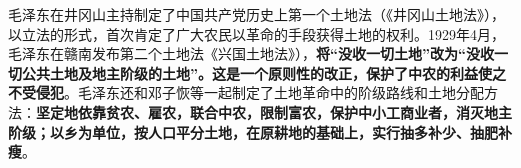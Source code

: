 {毛泽东在}井冈山主持制定了中国共产党历史上第一个土地法{（}《井冈山土地法》{），以立法的形式，首次肯定了广大农民以革命的手段获得土地的权利。1929年4月，毛泽东在赣南发布}第二个土地法《兴国土地法》）{，}\textbf{将``没收一切土地''改为``没收一切公共土地及地主阶级的土地''。这是一个原则性的改正，保护了中农的利益使之不受侵犯}{。毛泽东还和邓子恢等一起制定了土地革命中的阶级路线和土地分配方法：}\textbf{坚定地依靠贫农、雇农，联合中农，限制富农，保护中小工商业者，消灭地主阶级；以乡为单位，按人口平分土地，在原耕地的基础上，实行抽多补少、抽肥补瘦}{。}
